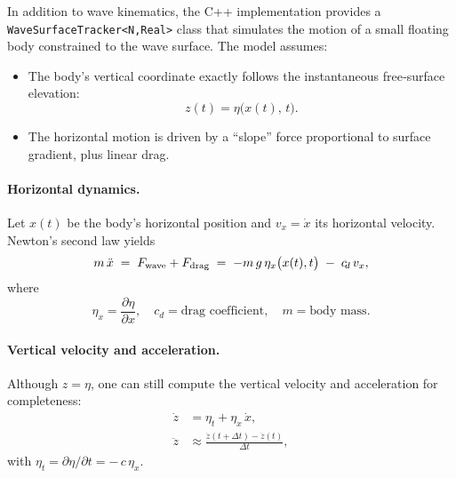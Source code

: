 \documentclass{article}
\begin{document}
In addition to wave kinematics, the C++ implementation provides a \texttt{WaveSurfaceTracker<N,Real>} class that simulates the motion of a small floating body constrained to the wave surface.  The model assumes:

\begin{itemize}
  \item The body’s vertical coordinate exactly follows the instantaneous free‐surface elevation:
    \[
      z(t) = \eta\bigl(x(t),\,t\bigr).
    \]
  \item The horizontal motion is driven by a “slope” force proportional to surface gradient, plus linear drag.
\end{itemize}

\paragraph{Horizontal dynamics.}  
Let \(x(t)\) be the body’s horizontal position and \(v_x = \dot x\) its horizontal velocity.  Newton’s second law yields
\begin{equation}
  m\,\ddot x \;=\; F_{\rm wave} + F_{\rm drag}
  \;=\;-m\,g\,\eta_x\bigl(x(t),t\bigr)
    \;-\;c_{\!d}\,v_x,
  \label{eq:tracker_motion}
\end{equation}
where
\[
  \eta_x = \frac{\partial \eta}{\partial x}, 
  \quad
  c_{\!d} = \text{drag coefficient}, 
  \quad
  m = \text{body mass}.
\]

\paragraph{Vertical velocity and acceleration.}  
Although \(z=\eta\), one can still compute the vertical velocity and acceleration for completeness:
\begin{align}
  \dot z &= \eta_t + \eta_x\,\dot x,
  \\
  \ddot z &\approx \frac{\dot z(t+\Delta t)-\dot z(t)}{\Delta t},
\end{align}
with \(\eta_t = \partial\eta/\partial t = -\,c\,\eta_x\).
\end{document}
